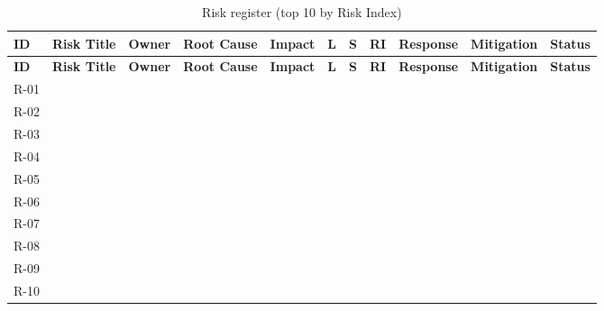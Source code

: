 %

\setlength{\tabcolsep}{3pt}
\begin{longtable}{C{0.6cm} L{1.8cm} L{1.3cm} L{1.4cm} L{1.8cm} C{0.5cm} C{0.5cm} C{0.6cm} L{1.5cm} L{1.8cm} L{1.1cm}}
    \caption{Risk register (top 10 by Risk Index)}
    \label{tab:risks} \\
    \toprule
    \textbf{ID} & \textbf{Risk Title} & \textbf{Owner} & \textbf{Root Cause}
        & \textbf{Impact} & \textbf{L} & \textbf{S} & \textbf{RI}
        & \textbf{Response} & \textbf{Mitigation} & \textbf{Status} \\
    \midrule
    \endfirsthead
    \toprule
    \textbf{ID} & \textbf{Risk Title} & \textbf{Owner} & \textbf{Root Cause}
        & \textbf{Impact} & \textbf{L} & \textbf{S} & \textbf{RI}
        & \textbf{Response} & \textbf{Mitigation} & \textbf{Status} \\
    \midrule
    \endhead
    \bottomrule
    \endlastfoot


    R-01 & & & & & & & & & & \\[4pt]
    R-02 & & & & & & & & & & \\[4pt]
    R-03 & & & & & & & & & & \\[4pt]
    R-04 & & & & & & & & & & \\[4pt]
    R-05 & & & & & & & & & & \\[4pt]
    R-06 & & & & & & & & & & \\[4pt]
    R-07 & & & & & & & & & & \\[4pt]
    R-08 & & & & & & & & & & \\[4pt]
    R-09 & & & & & & & & & & \\[4pt]
    R-10 & & & & & & & & & & \\[4pt]

\end{longtable}
\setlength{\tabcolsep}{6pt}


